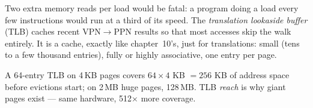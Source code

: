 Two extra memory reads per load would be fatal: a program doing a load
every few instructions would run at a third of its speed. The
\emph{translation lookaside buffer} (TLB) caches recent
VPN\(\to\)PPN results so that most accesses skip the walk entirely. It is a cache, exactly like
chapter~10's, just for translations: small (tens to a few thousand
entries), fully or highly associative, one entry per page.



\begin{example}
A 64-entry TLB on 4\,KB pages covers \(64\times4\) KB \(=256\) KB of address space
before evictions start; on 2\,MB huge pages, 128\,MB. TLB \emph{reach} is
why giant pages exist --- same hardware, 512\(\times\) more coverage.
\end{example}

